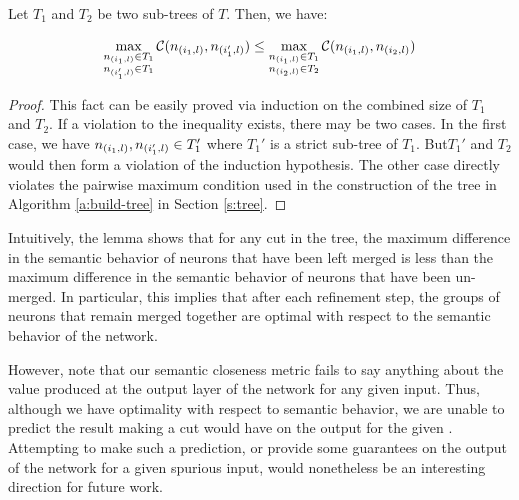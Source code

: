 \begin{lemma}
Let $T_1$ and $T_2$ be two sub-trees of $T$. Then, we have:

\begin{equation*}
\begin{aligned}
    \max_{ \substack{ n_{(i_1,l)} \in T_1 \\ n_{(i_1',l)} \in T_1 }} 
    \mathcal{C}( n_{(i_1,l)}, n_{(i_1',l)} ) \leq
    \max_{ \substack{ n_{(i_1,l)} \in T_1 \\ n_{(i_2,l)} \in T_2 }} 
    \mathcal{C}( n_{(i_1,l)}, n_{(i_2,l)} )
\end{aligned}
\end{equation*}

\end{lemma}
\begin{proof}
This fact can be easily proved via induction on the combined size of $T_1$ and
$T_2$. If a violation to the inequality exists, there may be two cases. In the
first case, we have $n_{(i_1,l)}, n_{(i_1',l)} \in T_1'$ where $T_1'$ is a
strict sub-tree of $T_1$. But$T_1'$ and $T_2$ would then form a violation of the
induction hypothesis. The other case directly violates the pairwise maximum
condition used in the construction of the tree in Algorithm \ref{a:build-tree}
in Section \ref{s:tree}.
\end{proof}

Intuitively, the lemma shows that for any cut in the tree, the
maximum difference in the semantic behavior of neurons that have been left
merged is less than the maximum difference in the semantic behavior of neurons
that have been un-merged. In particular, this implies that after each refinement
step, the groups of neurons that remain merged together are optimal with respect
to the semantic behavior of the network.

However, note that our semantic closeness metric fails to say anything about the
value produced at the output layer of the network for any given input. Thus,
although we have optimality with respect to semantic behavior, we are unable to
predict the result making a cut would have on the output for the given \gencex.
Attempting to make such a prediction, or provide some guarantees on the output
of the network for a given spurious input, would nonetheless be an interesting
direction for future work.

